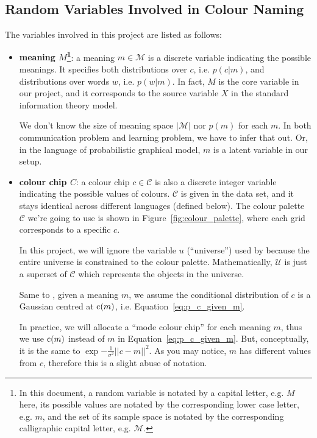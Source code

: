 \documentclass[11pt]{article}
\begin{document}
\subsection{Random Variables Involved in Colour Naming}
\label{appssec:uni_components}

The variables involved in this project are listed as follows:
\begin{itemize}[leftmargin=*]
    \item \textbf{meaning $M$\footnote{In this document, a random variable is notated by a capital letter, e.g. $M$ here, its possible values are notated by the corresponding lower case letter, e.g. $m$, and the set of its sample space is notated by the corresponding calligraphic capital letter, e.g. $\mathcal{M}$.}}: a meaning $m\in\mathcal{M}$ is a discrete variable indicating the possible meanings.
    It specifies both distributions over $c$, i.e. $p(c|m)$, and distributions over words $w$, i.e. $p(w|m)$.
    In fact, $M$ is the core variable in our project, and it corresponds to the source variable $X$ in the standard information theory model.
    
    We don't know the size of meaning space $|\mathcal{M}|$ nor $p(m)$ for each $m$.
    In both communication problem and learning problem, we have to infer that out.
    Or, in the language of probabilistic graphical model, $m$ is a latent variable in our setup.

    \item \textbf{colour chip $C$}: a colour chip $c\in\mathcal{C}$ is also a discrete integer variable indicating the possible values of colours. 
    $\mathcal{C}$ is given in the data set, and it stays identical across different languages (defined below). 
    The colour palette $\mathcal{C}$ we're going to use is shown in Figure~\ref{fig:colour_palette}, where each grid corresponds to a specific $c$.
        
    In this project, we will ignore the variable $u$ (``universe'') used by \citet{zaslavsky2018efficient} because the entire universe is constrained to the colour palette. 
    Mathematically, $\mathcal{U}$ is just a superset of $\mathcal{C}$ which represents the objects in the universe.
    
    Same to \cite{zaslavsky2018efficient}, given a meaning $m$, we assume the conditional distribution of $c$ is a Gaussian centred at ${\textnormal{c}}(m)$, i.e. Equation~\ref{eq:p_c_given_m}.
    
    In practice, we will allocate a ``mode colour chip'' for each meaning $m$, thus we use ${\textnormal{c}}(m)$ instead of $m$ in Equation~\ref{eq:p_c_given_m}.
    But, conceptually, it is the same to $\exp{-\frac{1}{\sigma^2}}||c-m||^2$. 
    As you may notice, $m$ has different values from $c$, therefore this is a slight abuse of notation.
    

\end{itemize}
\end{document}
